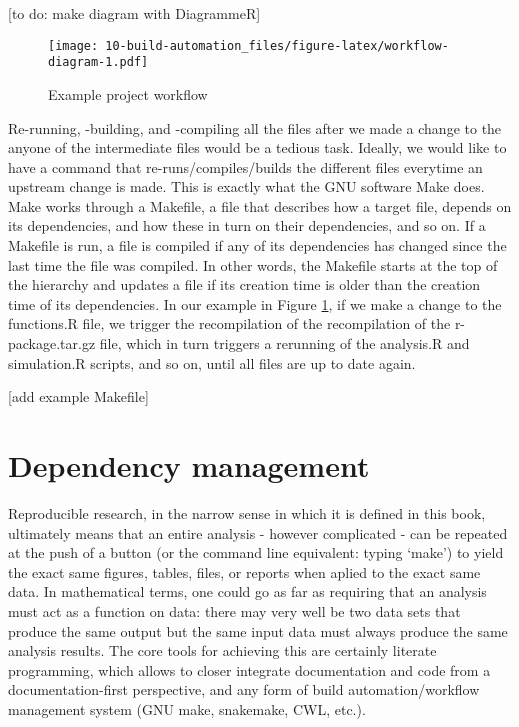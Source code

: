 \documentclass[]{book}
\begin{document}
{[}to do: make diagram with DiagrammeR{]}

\begin{figure}
\centering
\texttt{[image: 10-build-automation\_files/figure-latex/workflow-diagram-1.pdf]}
\caption{\label{fig:workflow-diagram}Example project workflow}
\end{figure}

Re-running, -building, and -compiling all the files after we made a
change to the anyone of the intermediate files would be a tedious task.
Ideally, we would like to have a command that re-runs/compiles/builds
the different files everytime an upstream change is made. This is
exactly what the GNU software Make does. Make works through a Makefile,
a file that describes how a target file, depends on its dependencies,
and how these in turn on their dependencies, and so on. If a Makefile is
run, a file is compiled if any of its dependencies has changed since the
last time the file was compiled. In other words, the Makefile starts at
the top of the hierarchy and updates a file if its creation time is
older than the creation time of its dependencies. In our example in
Figure \ref{fig:workflow-diagram}, if we make a change to the
functions.R file, we trigger the recompilation of the recompilation of
the r-package.tar.gz file, which in turn triggers a rerunning of the
analysis.R and simulation.R scripts, and so on, until all files are up
to date again.

{[}add example Makefile{]}

\chapter{Dependency management}\label{dependency-management}

Reproducible research, in the narrow sense in which it is defined in
this book, ultimately means that an entire analysis - however
complicated - can be repeated at the push of a button (or the command
line equivalent: typing `make') to yield the exact same figures, tables,
files, or reports when aplied to the exact same data. In mathematical
terms, one could go as far as requiring that an analysis must act as a
function on data: there may very well be two data sets that produce the
same output but the same input data must always produce the same
analysis results. The core tools for achieving this are certainly
literate programming, which allows to closer integrate documentation and
code from a documentation-first perspective, and any form of build
automation/workflow management system (GNU make, snakemake, CWL, etc.).
\end{document}
